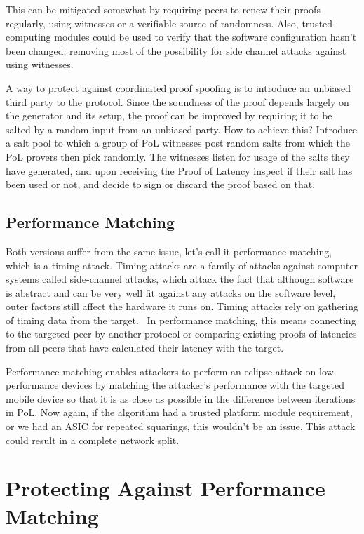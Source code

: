 This can be mitigated somewhat by requiring peers to renew their proofs regularly, using witnesses or a verifiable source of randomness. Also, trusted computing modules could be used to verify that the software configuration hasn't been changed, removing most of the possibility for side channel attacks against using witnesses.

A way to protect against coordinated proof spoofing is to introduce an unbiased third party to the protocol. Since the soundness of the proof depends largely on the generator and its setup, the proof can be improved by requiring it to be salted by a random input from an unbiased party. How to achieve this? Introduce a salt pool to which a group of PoL witnesses post random salts from which the PoL provers then pick randomly. The witnesses listen for usage of the salts they have generated, and upon receiving the Proof of Latency inspect if their salt has been used or not, and decide to sign or discard the proof based on that.

\subsection{Performance Matching}
Both versions suffer from the same issue, let's call it performance matching, which is a timing attack. Timing attacks are a family of attacks against computer systems called side-channel attacks, which attack the fact that although software is abstract and can be very well fit against any attacks on the software level, outer factors still affect the hardware it runs on. Timing attacks rely on gathering of timing data from the target.~\cite{noauthor_undated-mp} In performance matching, this means connecting to the targeted peer by another protocol or comparing existing proofs of latencies from all peers that have calculated their latency with the target.

Performance matching enables attackers to perform an eclipse attack on low-performance devices by matching the attacker's performance with the targeted mobile device so that it is as close as possible in the difference between iterations in PoL. Now again, if the algorithm had a trusted platform module requirement, or we had an ASIC for repeated squarings, this wouldn't be an issue. This attack could result in a complete network split.

\section{Protecting Against Performance Matching}

